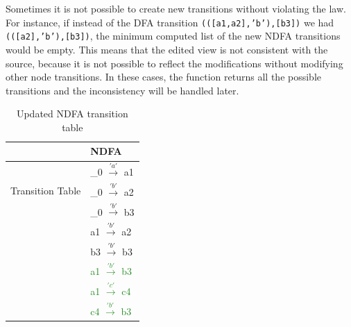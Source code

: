 Sometimes it is not possible to create new transitions without violating the law. For instance, if instead of the DFA transition \texttt{(([a1,a2],'b'),[b3])} we had \texttt{(([a2],'b'),[b3])}, the minimum computed list of the new NDFA transitions would be empty. This means that the edited view is not consistent with the source, because it is not possible to reflect the modifications without modifying other node transitions. In these cases, the function returns all the possible transitions and the inconsistency will be handled later. 

\begin{table}
  \begin{center}
    \begin{tabular}{ | p{3cm} | p{4cm}|  }
    \hline
         & NDFA \\ [1ex]
        \hline
        \hline
        \multirow{3}{5em}{Transition Table} & \_0 $\xrightarrow{'a'}$ a1\\
        & \_0 $\xrightarrow{'b'}$ a2 \\
        & \_0 $\xrightarrow{'b'}$ b3 \\
        & a1  $\xrightarrow{'b'}$ a2 \\
        & b3  $\xrightarrow{'b'}$ b3 \\
        & \textcolor{ForestGreen}{a1  $\xrightarrow{'b'}$ b3} \\
        & \textcolor{ForestGreen}{a1  $\xrightarrow{'c'}$ c4} \\
        & \textcolor{ForestGreen}{c4  $\xrightarrow{'b'}$ b3} \\
        \hline
        \end{tabular}
  \end{center}
  \caption{Updated NDFA transition table}
  \label{getablefinal}
\end{table}



